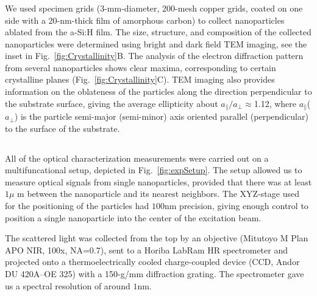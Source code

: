         \subsubsection{}
                We used specimen grids (3-mm-diameter, 200-mesh copper grids, coated on one side with a 20-nm-thick film
            of amorphous carbon) to collect nanoparticles ablated from the a-Si:H film. The size, structure, and composition
            of the collected nanoparticles were determined using bright and dark field TEM imaging, see the inset in
            Fig.~\ref{fig:Crystallinity}B. The analysis of the electron diffraction pattern from several nanoparticles shows clear maxima,
            corresponding to certain crystalline planes (Fig.~\ref{fig:Crystallinity}C).  TEM imaging also provides information
            on the oblateness of the particles along the direction perpendicular to the substrate surface, giving
            the average ellipticity about $a_{\parallel}/a_{\perp}\approx$1.12, where $a_{\parallel}$($a_{\perp}$) is
            the particle semi-major (semi-minor) axis oriented parallel (perpendicular) to the surface of the substrate.

    \subsection{}
            All of the optical characterization measurements were carried out on a multifuncational setup, depicted in
            Fig.~\ref{fig:expSetup}. The setup allowed us to measure optical signals from single nanoparticles, provided that
            there was at least $1\mu$ m between the nanoparticle and its nearest neighbors. The XYZ-stage used for the
            positioning of the particles had $100$nm precision, giving enough control to position a single nanoparticle into
            the center of the excitation beam.

            The scattered light was collected from the top by an objective (Mitutoyo M Plan APO NIR, 100x, NA=0.7),
            sent to a Horiba LabRam HR spectrometer and projected onto a thermoelectrically cooled charge-coupled device
            (CCD, Andor DU 420A--OE 325) with a 150-g/mm diffraction grating. The spectrometer gave us a spectral resolution
            of around $1$nm.

